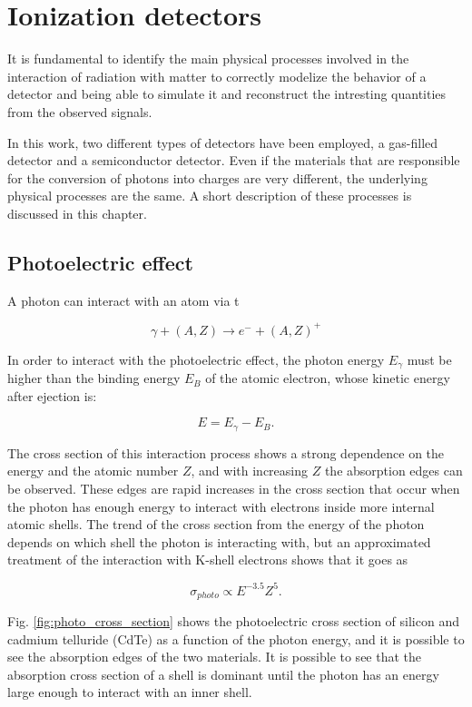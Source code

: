 \chapter{Ionization detectors}
\label{chap:detectors}

It is fundamental to identify the main physical processes involved in the interaction of radiation with matter to correctly modelize the behavior of a detector and being able to simulate it and reconstruct the intresting quantities from the observed signals.

In this work, two different types of detectors have been employed, a gas-filled detector and a semiconductor detector. Even if the materials that are responsible for the conversion of photons into charges are very different, the underlying physical processes are the same. A short description of these processes is discussed in this chapter.

\section{Photoelectric effect}
A photon can interact with an atom via t

\begin{equation}
\gamma + (A, Z) \rightarrow e^- + (A, Z)^+
\end{equation}

In order to interact with the photoelectric effect, the photon energy $E_{\gamma}$ must be higher than the binding energy $E_{B}$ of the atomic electron, whose kinetic energy after ejection is:

\begin{equation}
E = E_{\gamma} - E_{B}.
\end{equation} 

The cross section of this interaction process shows a strong dependence on the energy and the atomic number $Z$, and with increasing $Z$ the absorption edges can be observed. These edges are rapid increases in the cross section that occur when the photon has enough energy to interact with electrons inside more internal atomic shells. The trend of the cross section from the energy of the photon depends on which shell the photon is interacting with, but an approximated treatment of the interaction with K-shell electrons shows that it goes as

\begin{equation}
\sigma_{photo} \propto E^{-3.5}Z^5.
\end{equation}

Fig. \ref{fig:photo_cross_section} shows the photoelectric cross section of silicon and cadmium telluride (CdTe) as a function of the photon energy, and it is possible to see the absorption edges of the two materials. It is possible to see that the absorption cross section of a shell is dominant until the photon has an energy large enough to interact with an inner shell.

